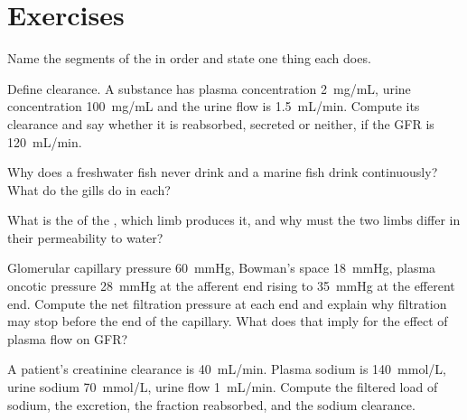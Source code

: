 \section{Exercises}

\begin{exercise}[$\star$]\label{exo:b3:renal-osmoregulation:1}
Name the segments of the  in order and state one thing each
does.
\end{exercise}

\begin{exercise}[$\star$]\label{exo:b3:renal-osmoregulation:2}
Define clearance. A substance has plasma concentration
\qty{2}{mg/mL}, urine concentration \qty{100}{mg/mL} and the urine flow
is \qty{1.5}{mL/min}. Compute its clearance and say whether it is
reabsorbed, secreted or neither, if the GFR is \qty{120}{mL/min}.
\end{exercise}

\begin{exercise}[$\star$]\label{exo:b3:renal-osmoregulation:3}
Why does a freshwater fish never drink and a marine fish drink
continuously? What do the gills do in each?
\end{exercise}

\begin{exercise}[$\star$]\label{exo:b3:renal-osmoregulation:4}
What is the  of the , which limb produces
it, and why must the two limbs differ in their permeability to water?
\end{exercise}

\begin{exercise}[$\star\star$]\label{exo:b3:renal-osmoregulation:5}
Glomerular capillary pressure \qty{60}{mmHg}, Bowman's space
\qty{18}{mmHg}, plasma oncotic pressure \qty{28}{mmHg} at the afferent
end rising to \qty{35}{mmHg} at the efferent end. Compute the net
filtration pressure at each end and explain why filtration may stop
before the end of the capillary. What does that imply for the effect
of plasma flow on GFR?
\end{exercise}

\begin{exercise}[$\star\star$]\label{exo:b3:renal-osmoregulation:6}
A patient's creatinine clearance is \qty{40}{mL/min}. Plasma sodium is
\qty{140}{mmol/L}, urine sodium \qty{70}{mmol/L}, urine flow
\qty{1}{mL/min}. Compute the filtered load of sodium, the excretion,
the fraction reabsorbed, and the sodium clearance.
\end{exercise}

